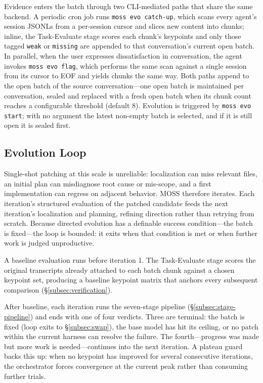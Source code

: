 \documentclass{article}
\begin{document}
Evidence enters the batch through two CLI-mediated paths that share the same backend. A periodic cron job runs \texttt{moss evo catch-up}, which scans every agent's session JSONLs from a per-session cursor and slices new content into chunks; inline, the Task-Evaluate stage scores each chunk's keypoints and only those tagged \texttt{weak} or \texttt{missing} are appended to that conversation's current open batch. In parallel, when the user expresses dissatisfaction in conversation, the agent invokes \texttt{moss evo flag}, which performs the same scan against a single session from its cursor to EOF and yields chunks the same way. Both paths append to the open batch of the source conversation---one open batch is maintained per conversation, sealed and replaced with a fresh open batch when its chunk count reaches a configurable threshold (default 8). Evolution is triggered by \texttt{moss evo start}; with no argument the latest non-empty batch is selected, and if it is still open it is sealed first.

\subsection{Evolution Loop}
\label{subsec:loop}

Single-shot patching at this scale is unreliable: localization can miss relevant files, an initial plan can misdiagnose root cause or mis-scope, and a first implementation can regress on adjacent behavior. MOSS therefore iterates. Each iteration's structured evaluation of the patched candidate feeds the next iteration's localization and planning, refining direction rather than retrying from scratch. Because directed evolution has a definable success condition---the batch is fixed---the loop is bounded: it exits when that condition is met or when further work is judged unproductive.

A baseline evaluation runs before iteration 1. The Task-Evaluate stage scores the original transcripts already attached to each batch chunk against a chosen keypoint set, producing a baseline keypoint matrix that anchors every subsequent comparison (\S\ref{subsec:verification}).

After baseline, each iteration runs the seven-stage pipeline (\S\ref{subsec:stage-pipeline}) and ends with one of four verdicts. Three are terminal: the batch is fixed (loop exits to \S\ref{subsec:swap}), the base model has hit its ceiling, or no patch within the current harness can resolve the failure. The fourth---progress was made but more work is needed---continues into the next iteration. A plateau guard backs this up: when no keypoint has improved for several consecutive iterations, the orchestrator forces convergence at the current peak rather than consuming further trials.
\end{document}
